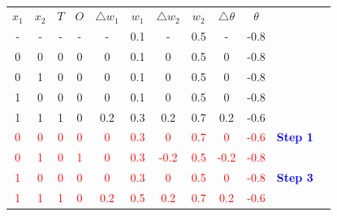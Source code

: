 \documentclass{book}
\begin{document}
\vspace{1cm}
\\
\begin{center}
    \begin{tabular}{|c|c|c|c|c|c|c|c|c|c|c|c }
        \cline{1-10}
        \rowcolor{lightblue}
        \textbf{\(x_1\)} & \textbf{\(x_2\)} & \textbf{\(T\)} & \textbf{\(O\)} & \textbf{\(\triangle w_1\)} & \textbf{\(w_1\)} & \textbf{\(\triangle w_2\)} & \textbf{\(w_2\)} & \textbf{\(\triangle \theta\)} & \textbf{\(\theta\)} & \cellcolor{white}{}\\
        \cline{1-10}
        - & - & - & - & - & 0.1 & - & 0.5 & - & -0.8 & \\
        \cline{1-10}
        0 & 0 & 0 & 0 & 0 & 0.1 & 0 & 0.5 & 0 & -0.8 & \\
        \cline{1-10}
        0 & 1 & 0 & 0 & 0 & 0.1 & 0 & 0.5 & 0 & -0.8 & \\
        \cline{1-10}
        1 & 0 & 0 & 0 & 0 & 0.1 & 0 & 0.5 & 0 & -0.8 & \\
        \cline{1-10}
        \rowcolor{lightyellow}
        1 & 1 & 1 & 0 & 0.2 & 0.3 & 0.2 & 0.7 & 0.2 & -0.6 & \cellcolor{white}{} \\
        \cline{1-10}
        \textcolor{red}{0} & \textcolor{red}{0} & \textcolor{red}{0} & \textcolor{red}{0} & \textcolor{red}{0} & \textcolor{red}{0.3} & \textcolor{red}{0} & \textcolor{red}{0.7} & \textcolor{red}{0} & \textcolor{red}{-0.6} & \textcolor{blue}{\textbf{Step 1}}\\
        \cline{1-10}
        \rowcolor{lightyellow}
        \textcolor{red}{0} & \textcolor{red}{1} & \textcolor{red}{0} & \textcolor{red}{1} & \textcolor{red}{0} & \textcolor{red}{0.3} & \textcolor{red}{-0.2} & \textcolor{red}{0.5} & \textcolor{red}{-0.2} & \textcolor{red}{-0.8} & \cellcolor{white}{\textcolor{blue}{\textbf{Step 2}}} \\
        \cline{1-10}
        \textcolor{red}{1} & \textcolor{red}{0} & \textcolor{red}{0} & \textcolor{red}{0} & \textcolor{red}{0} & \textcolor{red}{0.3} & \textcolor{red}{0} & \textcolor{red}{0.5} & \textcolor{red}{0} & \textcolor{red}{-0.8} & \textcolor{blue}{\textbf{Step 3}} \\
        \cline{1-10}
        \rowcolor{lightyellow}
        \textcolor{red}{1} & \textcolor{red}{1} & \textcolor{red}{1} & \textcolor{red}{0} & \textcolor{red}{0.2} & \textcolor{red}{0.5} & \textcolor{red}{0.2} & \textcolor{red}{0.7} & \textcolor{red}{0.2} & \textcolor{red}{-0.6} & \cellcolor{white}{\textcolor{blue}{\textbf{Step 4}}}\\

\end{tabular}
\end{center}
\end{document}

